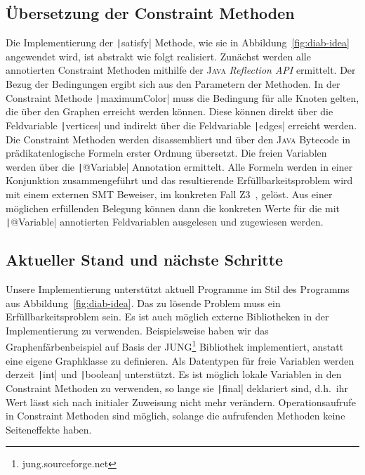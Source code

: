 \documentclass[a4paper,fontsize=12pt,headings=small,captions=tableheading,%
numbers=endperiod,abstracton,pdftex]{scrartcl}
\begin{document}
\subsection{Übersetzung der Constraint Methoden}
Die Implementierung der \texttt|satisfy| Methode, wie sie in
Abbildung~\ref{fig:diab-idea} angewendet wird, ist abstrakt wie folgt
realisiert.  Zunächst werden alle annotierten Constraint Methoden mithilfe der
\textsc{Java} \emph{Reflection API} ermittelt.  Der Bezug der Bedingungen ergibt
sich aus den Parametern der Methoden.  In der Constraint Methode
\texttt|maximumColor| muss die Bedingung für alle Knoten gelten, die
über den Graphen erreicht werden können.  Diese können direkt über die
Feldvariable \texttt|vertices| und indirekt über die Feldvariable
\texttt|edges| erreicht werden.  Die Constraint Methoden werden
dis\-as\-sem\-bliert und über den \textsc{Java} Bytecode in prädikatenlogische
Formeln erster Ordnung übersetzt.  Die freien Variablen werden über die
\texttt|@Variable| Annotation ermittelt.  Alle Formeln werden in einer
Konjunktion zusammengeführt und das resultierende Erfüllbarkeitsproblem wird mit
einem externen SMT Beweiser, im konkreten Fall Z3~\cite{MB:08}, gelöst.  Aus
einer möglichen erfüllenden Belegung können dann die konkreten Werte für die mit
\texttt|@Variable| annotierten Feldvariablen ausgelesen und zugewiesen
werden.

\subsection{Aktueller Stand und nächste Schritte}
Unsere Implementierung unterstützt aktuell Programme im Stil des Programms aus
Abbildung~\ref{fig:diab-idea}.  Das zu lösende Problem muss ein
Erfüllbarkeitsproblem sein.  Es ist auch möglich externe Bibliotheken in der
Implementierung zu verwenden.  Beispielsweise haben wir das
Graphenfärbenbeispiel auf Basis der JUNG\footnote{jung.sourceforge.net}
Bibliothek implementiert, anstatt eine eigene Graphklasse zu definieren.  Als
Datentypen für freie Variablen werden derzeit \texttt|int| und
\texttt|boolean| unterstützt.  Es ist möglich lokale Variablen in den
Constraint Methoden zu verwenden, so lange sie \texttt|final|
deklariert sind, d.h.~ihr Wert lässt sich nach initialer Zuweisung nicht mehr
verändern.  Operationsaufrufe in Constraint Methoden sind möglich, solange die
aufrufenden Methoden keine Seiteneffekte haben.
\end{document}
